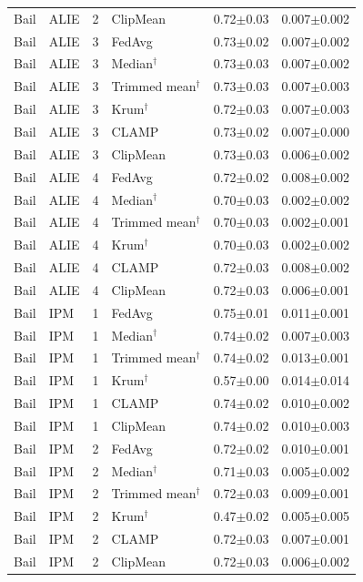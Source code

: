 \begin{longtable}{llclcc}
Bail & ALIE & 2 & ClipMean & 0.72$\pm$0.03 & 0.007$\pm$0.002 \\
Bail & ALIE & 3 & FedAvg & 0.73$\pm$0.02 & 0.007$\pm$0.002 \\
Bail & ALIE & 3 & Median$^\dagger$ & 0.73$\pm$0.03 & 0.007$\pm$0.002 \\
Bail & ALIE & 3 & Trimmed mean$^\dagger$ & 0.73$\pm$0.03 & 0.007$\pm$0.003 \\
Bail & ALIE & 3 & Krum$^\dagger$ & 0.72$\pm$0.03 & 0.007$\pm$0.003 \\
Bail & ALIE & 3 & CLAMP & 0.73$\pm$0.02 & 0.007$\pm$0.000 \\
Bail & ALIE & 3 & ClipMean & 0.73$\pm$0.03 & 0.006$\pm$0.002 \\
Bail & ALIE & 4 & FedAvg & 0.72$\pm$0.02 & 0.008$\pm$0.002 \\
Bail & ALIE & 4 & Median$^\dagger$ & 0.70$\pm$0.03 & 0.002$\pm$0.002 \\
Bail & ALIE & 4 & Trimmed mean$^\dagger$ & 0.70$\pm$0.03 & 0.002$\pm$0.001 \\
Bail & ALIE & 4 & Krum$^\dagger$ & 0.70$\pm$0.03 & 0.002$\pm$0.002 \\
Bail & ALIE & 4 & CLAMP & 0.72$\pm$0.03 & 0.008$\pm$0.002 \\
Bail & ALIE & 4 & ClipMean & 0.72$\pm$0.03 & 0.006$\pm$0.001 \\
Bail & IPM & 1 & FedAvg & 0.75$\pm$0.01 & 0.011$\pm$0.001 \\
Bail & IPM & 1 & Median$^\dagger$ & 0.74$\pm$0.02 & 0.007$\pm$0.003 \\
Bail & IPM & 1 & Trimmed mean$^\dagger$ & 0.74$\pm$0.02 & 0.013$\pm$0.001 \\
Bail & IPM & 1 & Krum$^\dagger$ & 0.57$\pm$0.00 & 0.014$\pm$0.014 \\
Bail & IPM & 1 & CLAMP & 0.74$\pm$0.02 & 0.010$\pm$0.002 \\
Bail & IPM & 1 & ClipMean & 0.74$\pm$0.02 & 0.010$\pm$0.003 \\
Bail & IPM & 2 & FedAvg & 0.72$\pm$0.02 & 0.010$\pm$0.001 \\
Bail & IPM & 2 & Median$^\dagger$ & 0.71$\pm$0.03 & 0.005$\pm$0.002 \\
Bail & IPM & 2 & Trimmed mean$^\dagger$ & 0.72$\pm$0.03 & 0.009$\pm$0.001 \\
Bail & IPM & 2 & Krum$^\dagger$ & 0.47$\pm$0.02 & 0.005$\pm$0.005 \\
Bail & IPM & 2 & CLAMP & 0.72$\pm$0.03 & 0.007$\pm$0.001 \\
Bail & IPM & 2 & ClipMean & 0.72$\pm$0.03 & 0.006$\pm$0.002 \\

\end{longtable}
